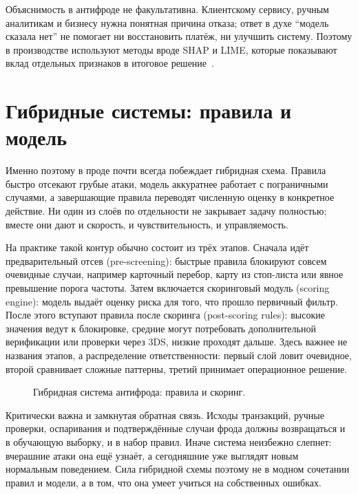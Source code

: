 Объяснимость в антифроде не факультативна. Клиентскому сервису,
ручным аналитикам и бизнесу нужна понятная причина отказа; ответ в
духе \enquote{модель сказала нет} не помогает ни восстановить платёж,
ни улучшить систему. Поэтому в производстве используют методы вроде
SHAP и LIME, которые показывают вклад отдельных признаков в итоговое
решение~\cite{lime-2016}\cite{shap-2017}.

\section{Гибридные системы: правила и модель}
\label{sec:fraud-hybrid}

Именно поэтому в проде почти всегда побеждает гибридная схема.
Правила быстро отсекают грубые атаки, модель аккуратнее работает с
пограничными случаями, а завершающие правила переводят численную
оценку в конкретное действие. Ни один из слоёв по отдельности не
закрывает задачу полностью; вместе они дают и скорость, и
чувствительность, и управляемость.

На практике такой контур обычно состоит из трёх этапов. Сначала идёт
предварительный отсев (pre-screening): быстрые правила блокируют
совсем очевидные случаи, например карточный перебор, карту из
стоп-листа или явное превышение порога частоты. Затем включается
скоринговый модуль (scoring engine): модель выдаёт оценку риска для
того, что прошло первичный фильтр. После этого вступают правила
после скоринга (post-scoring rules): высокие значения ведут к
блокировке, средние могут потребовать дополнительной верификации или
проверки через 3DS, низкие проходят дальше. Здесь важнее не названия
этапов, а распределение ответственности: первый слой ловит
очевидное, второй сравнивает сложные паттерны, третий принимает
операционное решение.

\begin{figure}[tbp]
  \centering
  \caption{Гибридная система антифрода: правила и скоринг.}
  \label{fig:fraud-hybrid}
\end{figure}

Критически важна и замкнутая обратная связь. Исходы транзакций,
ручные проверки, оспаривания и подтверждённые случаи фрода должны
возвращаться и в обучающую выборку, и в набор правил. Иначе система
неизбежно слепнет: вчерашние атаки она ещё узнаёт, а сегодняшние уже
выглядят новым нормальным поведением. Сила гибридной схемы поэтому
не в модном сочетании правил и модели, а в том, что она умеет
учиться на собственных ошибках.

